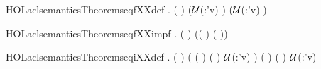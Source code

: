 \begin{SaveVerbatim}{HOLaclsemanticsTheoremseqfXXdef}
\HOLTokenTurnstile{} \HOLSymConst{\HOLTokenForall{}}    .
         (  ) \HOLSymConst{=}
     (\ensuremath{\cal{U}}(:'v)       \HOLConst{\HOLTokenUnion{}}     ) \HOLConst{\HOLTokenInter{}}
     (\ensuremath{\cal{U}}(:'v)       \HOLConst{\HOLTokenUnion{}}     )
\end{SaveVerbatim}
\newcommand{\HOLaclsemanticsTheoremseqfXXdef}{\UseVerbatim{HOLaclsemanticsTheoremseqfXXdef}}
\begin{SaveVerbatim}{HOLaclsemanticsTheoremseqfXXimpf}
\HOLTokenTurnstile{} \HOLSymConst{\HOLTokenForall{}}  .
         (  ) \HOLSymConst{=}
         ((  )  (  ))
\end{SaveVerbatim}
\newcommand{\HOLaclsemanticsTheoremseqfXXimpf}{\UseVerbatim{HOLaclsemanticsTheoremseqfXXimpf}}
\begin{SaveVerbatim}{HOLaclsemanticsTheoremseqiXXdef}
\HOLTokenTurnstile{} \HOLSymConst{\HOLTokenForall{}}    .
         (  ) \HOLSymConst{=}
     (   (  ) (  )  \ensuremath{\cal{U}}(:'v)
       \HOLTokenLeftbrace{}\HOLTokenRightbrace{}) \HOLConst{\HOLTokenInter{}}
        (  ) (  )  \ensuremath{\cal{U}}(:'v)
      \HOLTokenLeftbrace{}\HOLTokenRightbrace{}
\end{SaveVerbatim}
